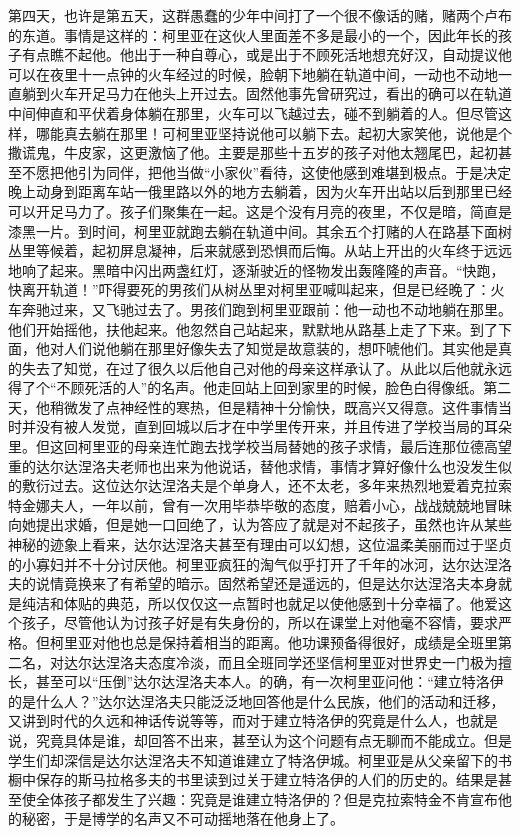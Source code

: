 第四天，也许是第五天，这群愚蠢的少年中间打了一个很不像话的赌，赌两个卢布的东道。事情是这样的：柯里亚在这伙人里面差不多是最小的一个，因此年长的孩子有点瞧不起他。他出于一种自尊心，或是出于不顾死活地想充好汉，自动提议他可以在夜里十一点钟的火车经过的时候，脸朝下地躺在轨道中间，一动也不动地一直躺到火车开足马力在他头上开过去。固然他事先曾研究过，看出的确可以在轨道中间伸直和平伏着身体躺在那里，火车可以飞越过去，碰不到躺着的人。但尽管这样，哪能真去躺在那里！可柯里亚坚持说他可以躺下去。起初大家笑他，说他是个撒谎鬼，牛皮家，这更激恼了他。主要是那些十五岁的孩子对他太翘尾巴，起初甚至不愿把他引为同伴，把他当做“小家伙”看待，这使他感到难堪到极点。于是决定晚上动身到距离车站一俄里路以外的地方去躺着，因为火车开出站以后到那里已经可以开足马力了。孩子们聚集在一起。这是个没有月亮的夜里，不仅是暗，简直是漆黑一片。到时间，柯里亚就跑去躺在轨道中间。其余五个打赌的人在路基下面树丛里等候着，起初屏息凝神，后来就感到恐惧而后悔。从站上开出的火车终于远远地响了起来。黑暗中闪出两盏红灯，逐渐驶近的怪物发出轰隆隆的声音。“快跑，快离开轨道！”吓得要死的男孩们从树丛里对柯里亚喊叫起来，但是已经晚了：火车奔驰过来，又飞驰过去了。男孩们跑到柯里亚跟前：他一动也不动地躺在那里。他们开始摇他，扶他起来。他忽然自己站起来，默默地从路基上走了下来。到了下面，他对人们说他躺在那里好像失去了知觉是故意装的，想吓唬他们。其实他是真的失去了知觉，在过了很久以后他自己对他的母亲这样承认了。从此以后他就永远得了个“不顾死活的人”的名声。他走回站上回到家里的时候，脸色白得像纸。第二天，他稍微发了点神经性的寒热，但是精神十分愉快，既高兴又得意。这件事情当时并没有被人发觉，直到回城以后才在中学里传开来，并且传进了学校当局的耳朵里。但这回柯里亚的母亲连忙跑去找学校当局替她的孩子求情，最后连那位德高望重的达尔达涅洛夫老师也出来为他说话，替他求情，事情才算好像什么也没发生似的敷衍过去。这位达尔达涅洛夫是个单身人，还不太老，多年来热烈地爱着克拉索特金娜夫人，一年以前，曾有一次用毕恭毕敬的态度，赔着小心，战战兢兢地冒昧向她提出求婚，但是她一口回绝了，认为答应了就是对不起孩子，虽然也许从某些神秘的迹象上看来，达尔达涅洛夫甚至有理由可以幻想，这位温柔美丽而过于坚贞的小寡妇并不十分讨厌他。柯里亚疯狂的淘气似乎打开了千年的冰河，达尔达涅洛夫的说情竟换来了有希望的暗示。固然希望还是遥远的，但是达尔达涅洛夫本身就是纯洁和体贴的典范，所以仅仅这一点暂时也就足以使他感到十分幸福了。他爱这个孩子，尽管他认为讨孩子好是有失身份的，所以在课堂上对他毫不容情，要求严格。但柯里亚对他也总是保持着相当的距离。他功课预备得很好，成绩是全班里第二名，对达尔达涅洛夫态度冷淡，而且全班同学还坚信柯里亚对世界史一门极为擅长，甚至可以“压倒”达尔达涅洛夫本人。的确，有一次柯里亚问他：“建立特洛伊的是什么人？”达尔达涅洛夫只能泛泛地回答他是什么民族，他们的活动和迁移，又讲到时代的久远和神话传说等等，而对于建立特洛伊的究竟是什么人，也就是说，究竟具体是谁，却回答不出来，甚至认为这个问题有点无聊而不能成立。但是学生们却深信是达尔达涅洛夫不知道谁建立了特洛伊城。柯里亚是从父亲留下的书橱中保存的斯马拉格多夫的书里读到过关于建立特洛伊的人们的历史的。结果是甚至使全体孩子都发生了兴趣：究竟是谁建立特洛伊的？但是克拉索特金不肯宣布他的秘密，于是博学的名声又不可动摇地落在他身上了。
